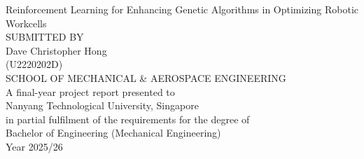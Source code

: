 \begin{titlepage}
\begin{center}

Reinforcement Learning for Enhancing Genetic Algorithms in Optimizing Robotic Workcells\\[1.8in]

SUBMITTED BY\\
Dave Christopher Hong\\
(U2220202D)\\[1.8in]

SCHOOL OF MECHANICAL \& AEROSPACE ENGINEERING\\[1.8in]

A final-year project report presented to\\
Nanyang Technological University, Singapore\\
in partial fulfilment of the requirements for the degree of\\
Bachelor of Engineering (Mechanical Engineering)\\[0.3in]

Year 2025/26
\end{center}
\newpage
\end{titlepage}